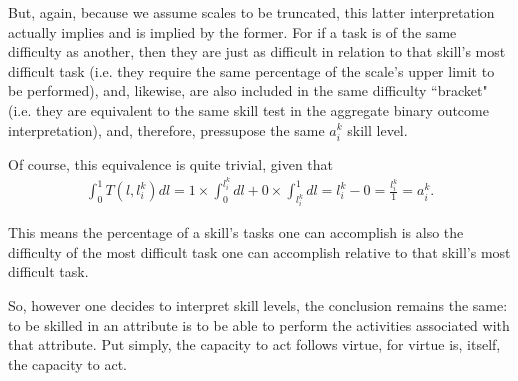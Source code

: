 {\begin{definition}[Skill]
        But, again, because we assume scales to be truncated, this latter interpretation
        actually implies and is implied by the former. For if a task is of the same
        difficulty as another, then they are just as difficult in relation to that
        skill's most difficult task (i.e. they require the same percentage of the
        scale's upper limit to be performed), and, likewise, are also included in the
        same difficulty ``bracket" (i.e. they are equivalent to the same skill test in
        the aggregate binary outcome interpretation), and, therefore, pressupose the
        same $a_{i}^{k}$ skill level.

        Of course, this equivalence is quite trivial, given that
        \begin{gather}
            \int_{0}^{1}{
            T(l, l_{i}^{k})
            dl
            }
            =
            1 \times \int_{0}^{l_{i}^{k}}{dl} +
            0 \times \int_{l_{i}^{k}}^{1}{dl}
            =
            l_{i}^{k} - 0
            =
            \frac{l_{i}^{k}}{1}
            =
            a_{i}^{k}
            .
        \end{gather}

        This means the percentage of a skill's tasks one can accomplish is also
        the difficulty of the most difficult task one can accomplish relative to that
        skill's most difficult task.

        So, however one decides to interpret skill levels, the conclusion remains the
        same: to be skilled in an attribute is to be able to perform the activities
        associated with that attribute. Put simply, the capacity to act follows virtue,
        for virtue is, itself, the capacity to act.
    \end{definition}
}


